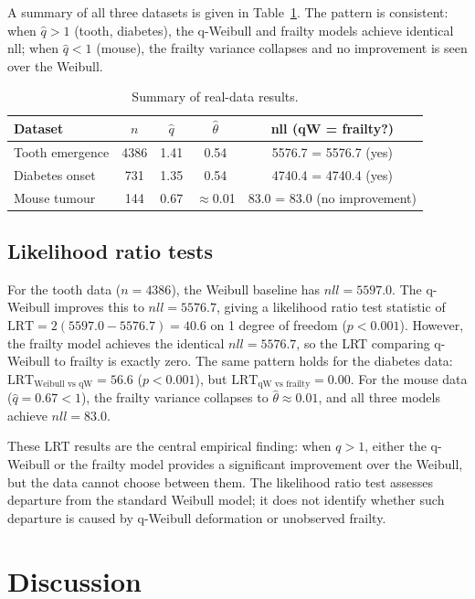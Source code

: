 \documentclass[12pt,a4paper]{article}
\begin{document}
A summary of all three datasets is given in Table~\ref{tab:summary}. The pattern is consistent: when $\hat q>1$ (tooth, diabetes), the q-Weibull and frailty models achieve identical nll; when $\hat q<1$ (mouse), the frailty variance collapses and no improvement is seen over the Weibull.

\begin{table}[ht]
\centering
\caption{Summary of real-data results.}
\begin{tabular}{lcccc}
\toprule
Dataset & $n$ & $\hat q$ & $\hat\theta$ & nll (qW = frailty?) \\
\midrule
Tooth emergence & 4386 & 1.41 & 0.54 & 5576.7 = 5576.7 (yes) \\
Diabetes onset & 731 & 1.35 & 0.54 & 4740.4 = 4740.4 (yes) \\
Mouse tumour & 144 & 0.67 & $\approx$0.01 & 83.0 = 83.0 (no improvement) \\
\bottomrule
\end{tabular}
\label{tab:summary}
\end{table}

\subsection{Likelihood ratio tests}

For the tooth data ($n=4386$), the Weibull baseline has $nll=5597.0$. The q-Weibull improves this to $nll=5576.7$, giving a likelihood ratio test statistic of $\mathrm{LRT}=2(5597.0-5576.7)=40.6$ on 1 degree of freedom ($p<0.001$). However, the frailty model achieves the identical $nll=5576.7$, so the LRT comparing q-Weibull to frailty is exactly zero. The same pattern holds for the diabetes data: $\mathrm{LRT}_{\text{Weibull vs qW}}=56.6$ ($p<0.001$), but $\mathrm{LRT}_{\text{qW vs frailty}}=0.00$. For the mouse data ($\hat q=0.67<1$), the frailty variance collapses to $\hat\theta\approx0.01$, and all three models achieve $nll=83.0$.

These LRT results are the central empirical finding: when $q>1$, either the q-Weibull or the frailty model provides a significant improvement over the Weibull, but the data cannot choose between them. The likelihood ratio test assesses departure from the standard Weibull model; it does not identify whether such departure is caused by q-Weibull deformation or unobserved frailty.

\section{Discussion}
\end{document}
